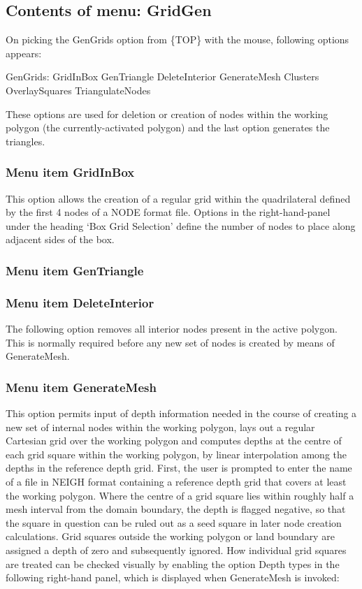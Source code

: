 \documentclass{article}
\begin{document}
\subsection{Contents of menu: GridGen}
On picking the GenGrids option from \{TOP\} with the mouse, following options appears:

GenGrids: GridInBox {\textbar} GenTriangle {\textbar} DeleteInterior GenerateMesh Clusters {\textbar} OverlaySquares {\textbar} TriangulateNodes

These options are used for deletion or creation of nodes within the working polygon (the currently-activated polygon) and the last option generates the triangles.

\subsubsection[Menu item GridInBox]{Menu item GridInBox}
This option allows the creation of a regular grid within the quadrilateral defined by the first 4 nodes of a NODE format file. Options in the right-hand-panel under the heading `Box Grid Selection' define the number of nodes to place along adjacent sides of the box.

\subsubsection[Menu item GenTriangle]{Menu item GenTriangle}

\bigskip

\subsubsection[Menu item DeleteInterior]{Menu item DeleteInterior}
The following option removes all interior nodes present in the active polygon. This is normally required before any new set of nodes is created by means of GenerateMesh.

\subsubsection[Menu item GenerateMesh]{Menu item GenerateMesh}
This option permits input of depth information needed in the course of creating a new set of internal nodes within the working polygon, lays out a regular Cartesian grid over the working polygon and computes depths at the centre of each grid square within the working polygon, by linear interpolation among the depths in the reference depth grid. First, the user is prompted to enter the name of a file in NEIGH format containing a reference depth grid that covers at least the working polygon. Where the centre of a grid square lies within roughly half a mesh interval from the domain boundary, the depth is flagged negative, so that the square in question can be ruled out as a seed square in later node creation calculations. Grid squares outside the working polygon or land boundary are assigned a depth of zero and subsequently ignored. How individual grid squares are treated can be checked visually by enabling the option {\textquotedbl}Depth types{\textquotedbl} in the following right-hand panel, which is 
displayed when GenerateMesh is invoked:
\end{document}

